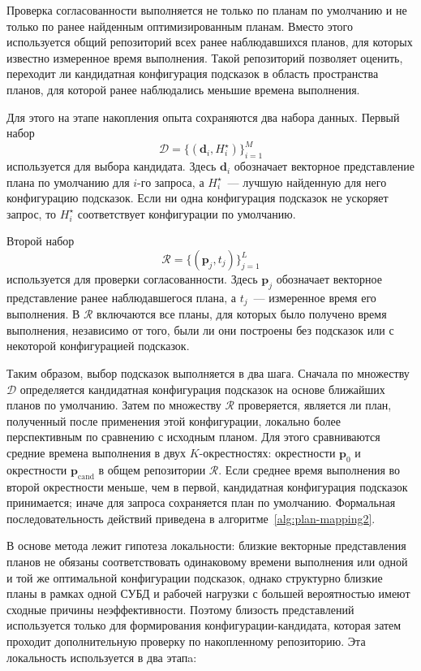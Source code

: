 Проверка согласованности выполняется не только по планам по умолчанию и не только по ранее найденным оптимизированным планам. Вместо этого используется общий репозиторий всех ранее наблюдавшихся планов, для которых известно измеренное время выполнения. Такой репозиторий позволяет оценить, переходит ли кандидатная конфигурация подсказок в область пространства планов, для которой ранее наблюдались меньшие времена выполнения. 

Для этого на этапе накопления опыта сохраняются два набора данных. Первый набор 
\[ 
\mathcal{D}=\{(\mathbf{d}_i,H_i^\star)\}_{i=1}^{M} 
\] 
используется для выбора кандидата. Здесь $\mathbf{d}_i$ обозначает векторное представление плана по умолчанию для $i$-го запроса, а $H_i^\star$~--- лучшую найденную для него конфигурацию подсказок. Если ни одна конфигурация подсказок не ускоряет запрос, то $H_i^\star$ соответствует конфигурации по умолчанию. 

Второй набор 
\[ 
\mathcal{R}=\{(\mathbf{p}_j,t_j)\}_{j=1}^{L} 
\] 
используется для проверки согласованности. Здесь $\mathbf{p}_j$ обозначает векторное представление ранее наблюдавшегося плана, а $t_j$~--- измеренное время его выполнения. В $\mathcal{R}$ включаются все планы, для которых было получено время выполнения, независимо от того, были ли они построены без подсказок или с некоторой конфигурацией подсказок. 

Таким образом, выбор подсказок выполняется в два шага. Сначала по множеству $\mathcal{D}$ определяется кандидатная конфигурация подсказок на основе ближайших планов по умолчанию. Затем по множеству $\mathcal{R}$ проверяется, является ли план, полученный после применения этой конфигурации, локально более перспективным по сравнению с исходным планом. Для этого сравниваются средние времена выполнения в двух $K$-окрестностях: окрестности $\mathbf{p}_0$ и окрестности $\mathbf{p}_{\mathrm{cand}}$ в общем репозитории $\mathcal{R}$. Если среднее время выполнения во второй окрестности меньше, чем в первой, кандидатная конфигурация подсказок принимается; иначе для запроса сохраняется план по умолчанию. Формальная последовательность действий приведена в алгоритме~\ref{alg:plan-mapping2}.

В основе метода лежит гипотеза локальности: близкие векторные представления планов не обязаны соответствовать одинаковому времени выполнения или одной и той же оптимальной конфигурации подсказок, однако структурно близкие планы в рамках одной СУБД и рабочей нагрузки с большей вероятностью имеют сходные причины неэффективности. Поэтому близость представлений используется только для формирования конфигурации-кандидата, которая затем проходит дополнительную проверку по накопленному репозиторию. Эта локальность используется в два этапa:

